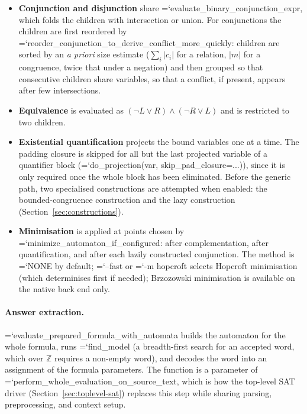 \documentclass[10pt,a4paper]{article}
\newcommand{\code}[1]{{\small\ttfamily\hyphenchar\font=`\-\relax #1}}
\newcommand{\Int}{\mathbb{Z}}
\begin{document}
\begin{itemize}
  \item \textbf{Conjunction and disjunction} share
        \code{evaluate\_\allowbreak binary\_\allowbreak conjunction\_\allowbreak expr}, which folds the children with intersection or
        union.  For conjunctions the children are first reordered by
        \code{reorder\_\allowbreak conjunction\_\allowbreak to\_\allowbreak derive\_\allowbreak conflict\_\allowbreak more\_\allowbreak quickly}: children are sorted by an
        \emph{a priori} size estimate ($\sum_i |c_i|$ for a relation, $|m|$ for a congruence, twice that
        under a negation) and then grouped so that consecutive children share variables, so that a
        conflict, if present, appears after few intersections.
  \item \textbf{Equivalence} is evaluated as
        $(\neg L \vee R) \wedge (\neg R \vee L)$ and is restricted to two children.
  \item \textbf{Existential quantification} projects the bound variables one at a time.  The padding
        closure is skipped for all but the last projected variable of a quantifier block
        (\code{do\_\allowbreak projection(var, skip\_\allowbreak pad\_\allowbreak closure=.\allowbreak .\allowbreak .\allowbreak )}), since it is only required once the whole
        block has been eliminated.  Before the generic path, two specialised constructions are
        attempted when enabled: the bounded-congruence construction and the lazy construction
        (Section~\ref{sec:constructions}).
  \item \textbf{Minimisation} is applied at points chosen by
        \code{minimize\_\allowbreak automaton\_\allowbreak if\_\allowbreak configured}: after complementation, after quantification, and
        after each lazily constructed conjunction.  The method is \code{NONE} by default;
        \code{--fast} or \code{-m hopcroft} selects Hopcroft minimisation (which determinises first if
        needed); Brzozowski minimisation is available on the native back end only.
\end{itemize}

\paragraph{Answer extraction.}
\code{evaluate\_\allowbreak prepared\_\allowbreak formula\_\allowbreak with\_\allowbreak automata} builds the automaton for the whole formula, runs
\code{find\_model} (a breadth-first search for an accepted word, which over $\Int$ requires a non-empty
word), and decodes the word into an assignment of the formula parameters.  The function is a parameter
of \code{perform\_\allowbreak whole\_\allowbreak evaluation\_\allowbreak on\_\allowbreak source\_\allowbreak text}, which is how the top-level SAT driver
(Section~\ref{sec:toplevel-sat}) replaces this step while sharing parsing, preprocessing, and context
setup.
\end{document}
